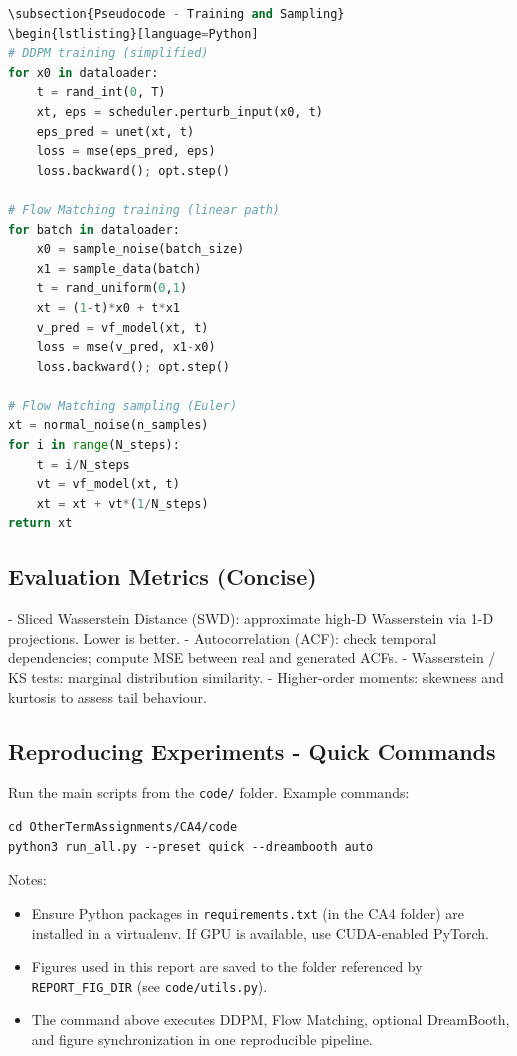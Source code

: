 \documentclass[a4paper,12pt]{article}
\begin{document}
\begin{lstlisting}[language=Python]
\subsection{Pseudocode - Training and Sampling}
\begin{lstlisting}[language=Python]
# DDPM training (simplified)
for x0 in dataloader:
    t = rand_int(0, T)
    xt, eps = scheduler.perturb_input(x0, t)
    eps_pred = unet(xt, t)
    loss = mse(eps_pred, eps)
    loss.backward(); opt.step()

# Flow Matching training (linear path)
for batch in dataloader:
    x0 = sample_noise(batch_size)
    x1 = sample_data(batch)
    t = rand_uniform(0,1)
    xt = (1-t)*x0 + t*x1
    v_pred = vf_model(xt, t)
    loss = mse(v_pred, x1-x0)
    loss.backward(); opt.step()

# Flow Matching sampling (Euler)
xt = normal_noise(n_samples)
for i in range(N_steps):
    t = i/N_steps
    vt = vf_model(xt, t)
    xt = xt + vt*(1/N_steps)
return xt
\end{lstlisting}

\subsection{Evaluation Metrics (Concise)}
- Sliced Wasserstein Distance (SWD): approximate high-D Wasserstein via 1-D projections. Lower is better.
- Autocorrelation (ACF): check temporal dependencies; compute MSE between real and generated ACFs.
- Wasserstein / KS tests: marginal distribution similarity.
- Higher-order moments: skewness and kurtosis to assess tail behaviour.

\subsection{Reproducing Experiments - Quick Commands}
Run the main scripts from the \texttt{code/} folder. Example commands:
\begin{verbatim}
cd OtherTermAssignments/CA4/code
python3 run_all.py --preset quick --dreambooth auto
\end{verbatim}

Notes:
\begin{itemize}
    \item Ensure Python packages in \texttt{requirements.txt} (in the CA4 folder) are installed in a virtualenv. If GPU is available, use CUDA-enabled PyTorch.
    \item Figures used in this report are saved to the folder referenced by \texttt{REPORT\_FIG\_DIR} (see \texttt{code/utils.py}).
    \item The command above executes DDPM, Flow Matching, optional DreamBooth, and figure synchronization in one reproducible pipeline.
\end{itemize}
\end{document}
